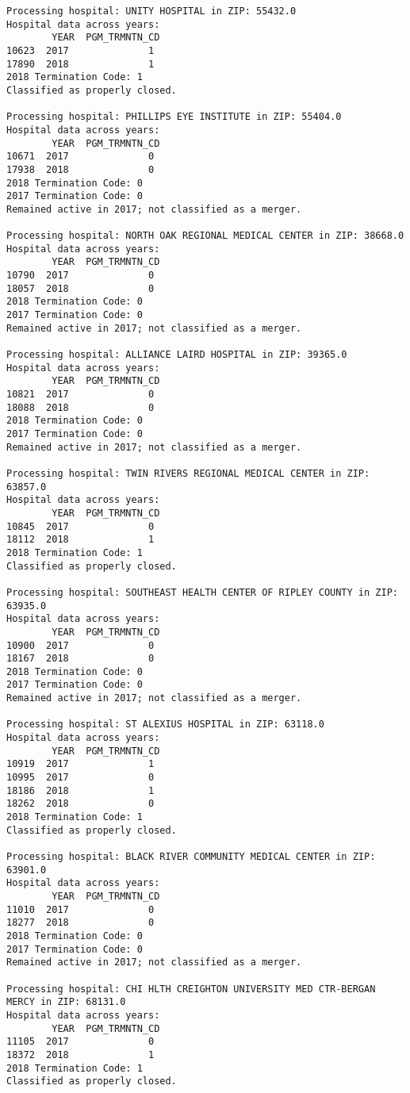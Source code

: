 \documentclass[
  letterpaper,
  DIV=11,
  numbers=noendperiod]{scrartcl}
\begin{document}
\begin{verbatim}
Processing hospital: UNITY HOSPITAL in ZIP: 55432.0
Hospital data across years:
        YEAR  PGM_TRMNTN_CD
10623  2017              1
17890  2018              1
2018 Termination Code: 1
Classified as properly closed.

Processing hospital: PHILLIPS EYE INSTITUTE in ZIP: 55404.0
Hospital data across years:
        YEAR  PGM_TRMNTN_CD
10671  2017              0
17938  2018              0
2018 Termination Code: 0
2017 Termination Code: 0
Remained active in 2017; not classified as a merger.

Processing hospital: NORTH OAK REGIONAL MEDICAL CENTER in ZIP: 38668.0
Hospital data across years:
        YEAR  PGM_TRMNTN_CD
10790  2017              0
18057  2018              0
2018 Termination Code: 0
2017 Termination Code: 0
Remained active in 2017; not classified as a merger.

Processing hospital: ALLIANCE LAIRD HOSPITAL in ZIP: 39365.0
Hospital data across years:
        YEAR  PGM_TRMNTN_CD
10821  2017              0
18088  2018              0
2018 Termination Code: 0
2017 Termination Code: 0
Remained active in 2017; not classified as a merger.

Processing hospital: TWIN RIVERS REGIONAL MEDICAL CENTER in ZIP: 63857.0
Hospital data across years:
        YEAR  PGM_TRMNTN_CD
10845  2017              0
18112  2018              1
2018 Termination Code: 1
Classified as properly closed.

Processing hospital: SOUTHEAST HEALTH CENTER OF RIPLEY COUNTY in ZIP: 63935.0
Hospital data across years:
        YEAR  PGM_TRMNTN_CD
10900  2017              0
18167  2018              0
2018 Termination Code: 0
2017 Termination Code: 0
Remained active in 2017; not classified as a merger.

Processing hospital: ST ALEXIUS HOSPITAL in ZIP: 63118.0
Hospital data across years:
        YEAR  PGM_TRMNTN_CD
10919  2017              1
10995  2017              0
18186  2018              1
18262  2018              0
2018 Termination Code: 1
Classified as properly closed.

Processing hospital: BLACK RIVER COMMUNITY MEDICAL CENTER in ZIP: 63901.0
Hospital data across years:
        YEAR  PGM_TRMNTN_CD
11010  2017              0
18277  2018              0
2018 Termination Code: 0
2017 Termination Code: 0
Remained active in 2017; not classified as a merger.

Processing hospital: CHI HLTH CREIGHTON UNIVERSITY MED CTR-BERGAN MERCY in ZIP: 68131.0
Hospital data across years:
        YEAR  PGM_TRMNTN_CD
11105  2017              0
18372  2018              1
2018 Termination Code: 1
Classified as properly closed.


\end{verbatim}
\end{document}
